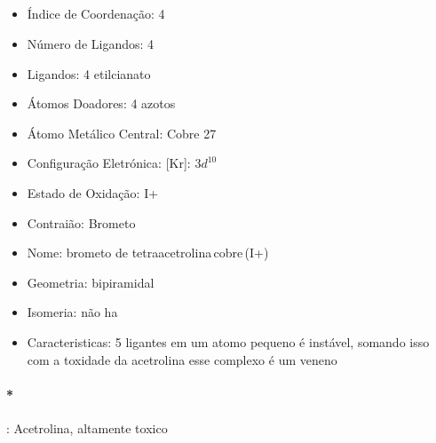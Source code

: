 \documentclass[12pt]{article}
\begin{document}
\noindent\begin{minipage}{\textwidth}
	
	\subsection{}
	\begin{itemize}
   
   \item Índice de Coordenação:
   	4
   
   \item Número de Ligandos:
   	4
   
   \item Ligandos:
   	4 etilcianato
   
   \item Átomos Doadores:
   	4 azotos
   
   \item Átomo Metálico Central:
   	Cobre 27
   
   \item Configuração Eletrónica:
   	[Kr]: $3d^10$
   
   \item Estado de Oxidação:
   	I+
   
   \item Contraião:
   	Brometo 
   
   \item Nome:
   	brometo de tetraacetrolina\,cobre\,(I+)
   
   \item Geometria:
   	bipiramidal
   
   \item Isomeria:
   	não ha

	\item Caracteristicas:	
		5 ligantes em um atomo pequeno é instável, somando isso com a toxidade da acetrolina esse complexo é um veneno

	\end{itemize}
	
\end{minipage}

\paragraph{*}
: Acetrolina, altamente toxico
\end{document}
